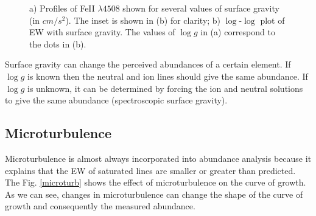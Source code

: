 \documentclass[dvips,12pt,a4paper]{report}
\begin{document}
{\begin{figure}[h]
\centering
\caption[Line Profiles of FeII with $\log g$] {a) Profiles of FeII $\lambda4508$ shown for several values of surface gravity (in $cm/s^2$). The inset is shown in (b) for clarity; b) $\log$-$\log$ plot of EW with surface gravity. The values of $\log g$ in (a) correspond to the dots in (b).}
\label{cogpmt}
\end{figure}

Surface gravity can change the perceived abundances of a certain element. If $\log g$  is known then the neutral and ion lines should give the same abundance. If $\log g$ is unknown, it can be determined by forcing the ion and neutral solutions to give the same abundance (spectroscopic surface gravity).

\subsection{Microturbulence}
\label{microturbo}
Microturbulence is almost always incorporated into abundance analysis because it explains that the EW of saturated lines are smaller or greater than predicted. The Fig. \ref{microturb} shows the effect of microturbulence on the curve of growth. As we can see, changes in microturbulence can change the shape of the curve of growth and consequently the measured abundance. 

}
\end{document}
